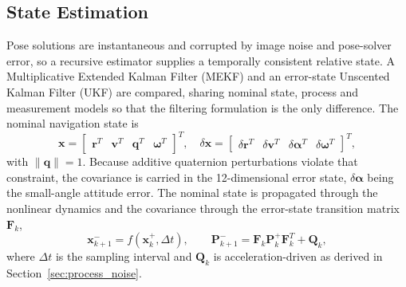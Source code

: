 \subsection{State Estimation}

Pose solutions are instantaneous and corrupted by image noise and pose-solver
error, so a recursive estimator supplies a temporally consistent relative
state. A Multiplicative Extended Kalman Filter (MEKF) \cite{markley2003} and
an error-state Unscented Kalman Filter (UKF) \cite{julier2004} are compared,
sharing nominal state, process and measurement models so that the filtering
formulation is the only difference. The nominal navigation state is
\begin{equation}
    \mathbf{x}
    =
    \begin{bmatrix}
        \mathbf{r}^{T} & \mathbf{v}^{T} &
        \mathbf{q}^{T} & \boldsymbol{\omega}^{T}
    \end{bmatrix}^{T},
    \quad
    \delta\mathbf{x}
    =
    \begin{bmatrix}
        \delta\mathbf{r}^{T} & \delta\mathbf{v}^{T} &
        \delta\boldsymbol{\alpha}^{T} & \delta\boldsymbol{\omega}^{T}
    \end{bmatrix}^{T},
\end{equation}
with $\|\mathbf{q}\|=1$. Because additive quaternion perturbations violate
that constraint, the covariance is carried in the 12-dimensional error state,
$\delta\boldsymbol{\alpha}$ being the small-angle attitude error. The nominal
state is propagated through the nonlinear dynamics and the covariance through
the error-state transition matrix $\mathbf{F}_k$,
\begin{equation}
    \mathbf{x}_{k+1}^{-} = f(\mathbf{x}_{k}^{+},\Delta t),
    \qquad
    \mathbf{P}_{k+1}^{-}
    =
    \mathbf{F}_{k}\mathbf{P}_{k}^{+}\mathbf{F}_{k}^{T}+\mathbf{Q}_{k},
\end{equation}
where $\Delta t$ is the sampling interval and $\mathbf{Q}_k$ is
acceleration-driven as derived in Section~\ref{sec:process_noise}.

